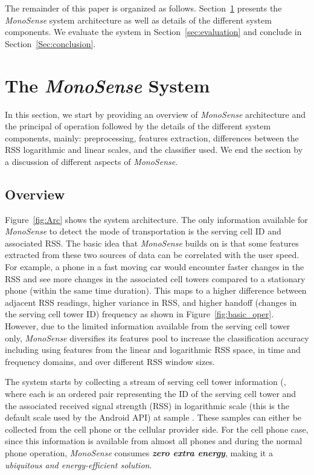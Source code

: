 \documentclass[conference]{IEEEtran}
\def \sys {\textit{MonoSense}}
\begin{document}
 The remainder of this paper is organized as follows.  Section~\ref{sec:system} presents the \sys{} system architecture as well as details of the different system components.
 We evaluate the system in Section~\ref{sec:evaluation} and conclude in Section~\ref{Sec:conclusion}.





    	                                                                \section{The \sys{} System}\label{sec:system}
In this section, we start by providing an overview of \sys{} architecture and the principal of operation followed by the details of the different system components, mainly: preprocessing, features extraction, differences between the RSS logarithmic and linear scales, and the classifier used. We end the section by a discussion of different aspects of \sys{}.

\subsection{Overview}
Figure~\ref{fig:Arc} shows the system architecture. The only information available for \sys{} to detect the mode of transportation is the serving cell ID and associated RSS. The basic idea that \sys{} builds on is that some features extracted from these two sources of data can be correlated with the user speed. For example, a phone in a fast moving car would encounter faster changes in the RSS and see more changes in the associated cell towers compared to a stationary phone (within the same time duration). This maps to a higher difference between adjacent RSS readings, higher variance in RSS, and higher handoff (changes in the serving cell tower ID) frequency as shown in Figure~\ref{fig:basic_oper}. However, due to the limited information available from the serving cell tower only, \sys{} diversifies its features pool to increase the classification accuracy including using features from the linear and logarithmic RSS space, in time and frequency domains, and over different RSS window sizes.


The system starts by collecting a stream of serving cell tower information (, where each  is an ordered pair  representing the ID of the serving cell tower and the associated received signal strength (RSS) in logarithmic scale (this is the default scale used by the Android API) at sample . These samples can either be collected from the cell phone or the cellular provider side. For the cell phone case, since this information is available from almost all phones and during the normal phone operation, \sys{} consumes \textbf{\emph{zero extra energy}}, making it a \emph{ubiquitous and energy-efficient solution}.
\end{document}
